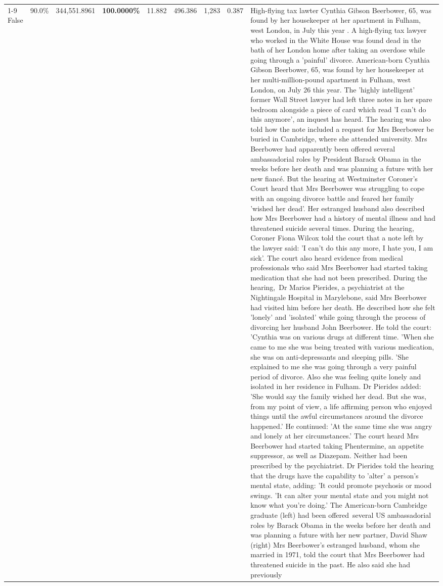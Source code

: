 \begin{table}[H]
\begin{tabular}{lllrlllll}
\cline{1-9}
False & 90.0\% & 344,551.8961 & \bfseries \color{red} 100.0000\% & 11.882 & 496.386 & 1,283 & 0.387 & High-flying tax lawter Cynthia Gibson Beerbower, 65, was found by her housekeeper at her apartment in Fulham, west London, in July this year . A high-flying tax lawyer who worked in the White House was found dead in the bath of her London home after taking an overdose while going through a 'painful' divorce. American-born Cynthia Gibson Beerbower, 65, was found by her housekeeper at her multi-million-pound apartment in Fulham, west London, on July 26 this year. The 'highly intelligent' former Wall Street lawyer had left three notes in her spare bedroom alongside a piece of card which read 'I can't do this anymore', an inquest has heard. The hearing was also told how the note included a request for Mrs Beerbower be buried in Cambridge, where she attended university. Mrs Beerbower had apparently been offered several ambassadorial roles by President Barack Obama in the weeks before her death and was planning a future with her new fiancé. But the hearing at Westminster Coroner's Court heard that Mrs Beerbower was struggling to cope with an ongoing divorce battle and feared her family 'wished her dead'. Her estranged husband also described how Mrs Beerbower had a history of mental illness and had threatened suicide several times. During the hearing, Coroner Fiona Wilcox told the court that a note left by the lawyer said: 'I can't do this any more, I hate you, I am sick'. The court also heard evidence from medical professionals who said Mrs Beerbower had started taking medication that she had not been prescribed. During the hearing, Dr Marios Pierides, a psychiatrist at the Nightingale Hospital in Marylebone, said Mrs Beerbower had visited him before her death. He described how she felt 'lonely' and 'isolated' while going through the process of divorcing her husband John Beerbower. He told the court: 'Cynthia was on various drugs at different time. 'When she came to me she was being treated with various medication, she was on anti-depressants and sleeping pills. 'She explained to me she was going through a very painful period of divorce. Also she was feeling quite lonely and isolated in her residence in Fulham. Dr Pierides added: 'She would say the family wished her dead. But she was, from my point of view, a life affirming person who enjoyed things until the awful circumstances around the divorce happened.' He continued: 'At the same time she was angry and lonely at her circumstances.' The court heard Mrs Beerbower had started taking Phentermine, an appetite suppressor, as well as Diazepam. Neither had been prescribed by the psychiatrist. Dr Pierides told the hearing that the drugs have the capability to 'alter' a person's mental state, adding: 'It could promote psychosis or mood swings. 'It can alter your mental state and you might not know what you're doing.' The American-born Cambridge graduate (left) had been offered several US ambassadorial roles by Barack Obama in the weeks before her death and was planning a future with her new partner, David Shaw (right) Mrs Beerbower's estranged husband, whom she married in 1971, told the court that Mrs Beerbower had threatened suicide in the past. He also said she had previously 
\end{tabular}
\end{table}
